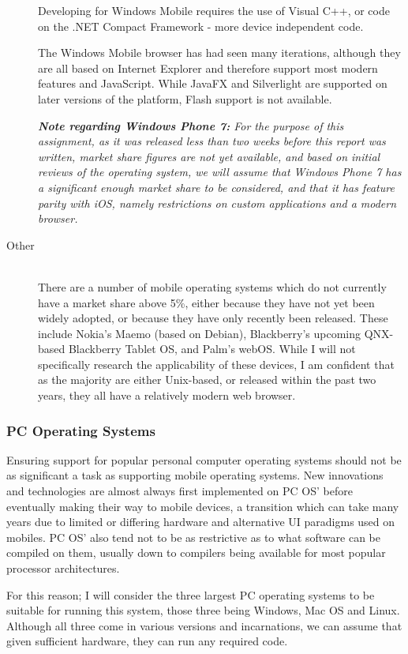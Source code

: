 \begin{description}
Developing for Windows Mobile requires the use of Visual C++, or code on the .NET Compact Framework - more device independent code.

The Windows Mobile browser has had seen many iterations, although they are all based on Internet Explorer and therefore support most modern features and JavaScript. While JavaFX and Silverlight are supported on later versions of the platform, Flash support is not available.

{\it{\bf Note regarding Windows Phone 7:} For the purpose of this assignment, as it was released less than two weeks before this report was written, market share figures are not yet available, and based on initial reviews of the operating system, we will assume that Windows Phone 7 has a significant enough market share to be considered, and that it has feature parity with iOS, namely restrictions on custom applications and a modern browser.}

\item[Other] \hfill \\
There are a number of mobile operating systems which do not currently have a market share above 5\%, either because they have not yet been widely adopted, or because they have only recently been released. These include Nokia's Maemo (based on Debian), Blackberry's upcoming QNX-based Blackberry Tablet OS, and Palm's webOS. While I will not specifically research the applicability of these devices, I am confident that as the majority are either Unix-based, or released within the past two years, they all have a relatively modern web browser.

\end{description}

\subsubsection{PC Operating Systems}
Ensuring support for popular personal computer operating systems should not be as significant a task as supporting mobile operating systems. New innovations and technologies are almost always first implemented on PC OS' before eventually making their way to mobile devices, a transition which can take many years due to limited or differing hardware and alternative UI paradigms used on mobiles. PC OS' also tend not to be as restrictive as to what software can be compiled on them, usually down to compilers being available for most popular processor architectures.

For this reason; I will consider the three largest PC operating systems to be suitable for running this system, those three being Windows, Mac OS and Linux. Although all three come in various versions and incarnations, we can assume that given sufficient hardware, they can run any required code.
